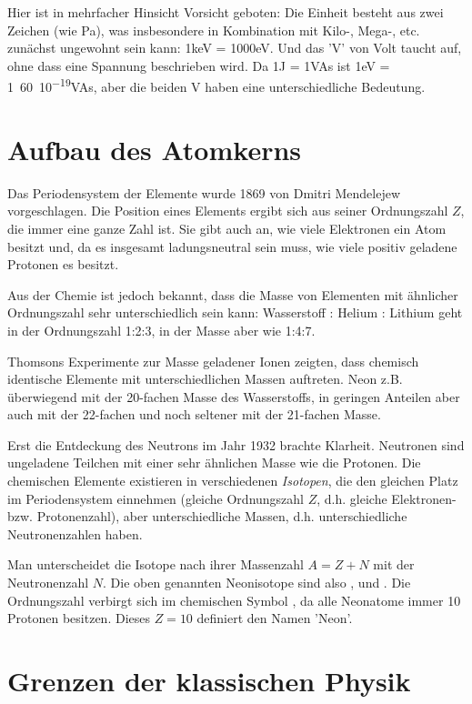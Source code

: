 Hier ist in mehrfacher Hinsicht Vorsicht geboten: Die Einheit besteht aus zwei Zeichen (wie Pa), was insbesondere in Kombination mit Kilo-, Mega-, etc. zunächst ungewohnt sein kann: \si{1}{keV} = \si{1000}{eV}. Und das 'V' von Volt taucht auf, ohne dass eine Spannung beschrieben wird. Da \si{1}{J} = \si{1}{VAs} ist \si{1}{eV} = \si{1.60 10^{-19}}{VAs}, aber die beiden V haben eine unterschiedliche Bedeutung.


\section{Aufbau des Atomkerns}

Das Periodensystem der Elemente wurde 1869 von Dmitri Mendelejew vorgeschlagen. Die Position eines Elements ergibt sich aus seiner Ordnungszahl $Z$, die immer eine ganze Zahl ist. Sie gibt auch an, wie viele Elektronen ein Atom besitzt und, da es insgesamt ladungsneutral sein muss, wie viele positiv geladene Protonen es besitzt. 

Aus der Chemie ist jedoch bekannt, dass die Masse von Elementen mit ähnlicher Ordnungszahl sehr unterschiedlich sein kann: Wasserstoff : Helium : Lithium geht in der Ordnungszahl 1:2:3, in der Masse aber wie 1:4:7.

Thomsons Experimente zur Masse geladener Ionen zeigten, dass chemisch identische Elemente mit unterschiedlichen Massen auftreten. Neon z.B. überwiegend mit der 20-fachen Masse des Wasserstoffs, in geringen Anteilen aber auch mit der 22-fachen und noch seltener mit der 21-fachen Masse.

Erst die Entdeckung des Neutrons im Jahr 1932 brachte Klarheit. Neutronen sind ungeladene Teilchen mit einer sehr ähnlichen Masse wie die Protonen. Die chemischen Elemente existieren in verschiedenen \emph{Isotopen}, die den gleichen Platz im Periodensystem einnehmen (gleiche Ordnungszahl $Z$, d.h. gleiche Elektronen- bzw. Protonenzahl), aber unterschiedliche Massen, d.h. unterschiedliche Neutronenzahlen haben.

Man unterscheidet die Isotope nach ihrer Massenzahl $A = Z + N$ mit der Neutronenzahl $N$. Die oben genannten Neonisotope sind also ,  und . Die Ordnungszahl verbirgt sich im chemischen Symbol , da alle Neonatome immer 10 Protonen besitzen. Dieses $Z=10$ definiert den Namen 'Neon'.


\section{Grenzen der klassischen Physik}

